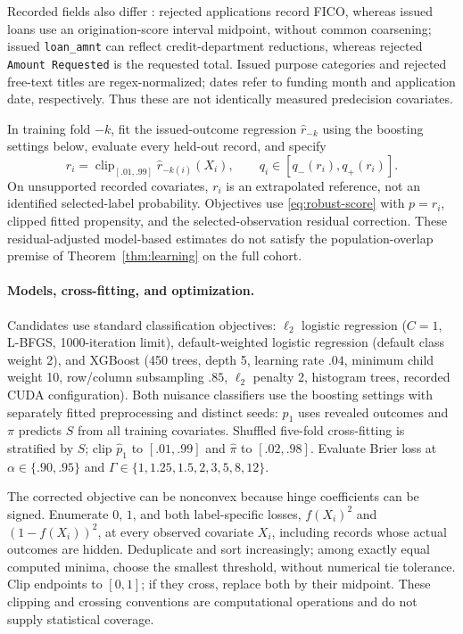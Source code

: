 Recorded fields also differ \citep{lendingclubdictionary}: rejected applications
record FICO, whereas issued loans use an origination-score interval midpoint,
without common coarsening; issued \texttt{loan\_amnt} can reflect credit-department
reductions, whereas rejected \texttt{Amount Requested} is the requested total.
Issued purpose categories and rejected free-text titles are regex-normalized;
dates refer to funding month and application date, respectively. Thus these are
not identically measured predecision covariates.

In training fold $-k$, fit the issued-outcome regression $\widehat r_{-k}$ using
the boosting settings below, evaluate every held-out record, and specify
\begin{equation}\label{eq:d:historical-extension}
r_i=\operatorname{clip}_{[.01,.99]}\widehat r_{-k(i)}(X_i),
\qquad q_i\in[q_-(r_i),q_+(r_i)].
\end{equation}
On unsupported recorded covariates, $r_i$ is an extrapolated reference, not an
identified selected-label probability. Objectives use \eqref{eq:robust-score}
with $p=r_i$, clipped fitted propensity, and the selected-observation residual
correction. These residual-adjusted model-based estimates do not satisfy the
population-overlap premise of Theorem~\ref{thm:learning} on the full cohort.

\paragraph{Models, cross-fitting, and optimization.}
Candidates use standard classification objectives: $\ell_2$ logistic regression
($C=1$, L-BFGS, 1000-iteration limit), default-weighted logistic regression
(default class weight 2), and XGBoost \citep{chen2016xgboost} (450 trees,
depth 5, learning rate $.04$, minimum child weight 10, row/column subsampling
$.85$, $\ell_2$ penalty 2, histogram trees, recorded CUDA configuration).
Both nuisance classifiers use the boosting settings with separately fitted
preprocessing and distinct seeds: $p_1$ uses revealed outcomes and $\pi$
predicts $S$ from all training covariates. Shuffled five-fold cross-fitting is
stratified by $S$; clip $\widehat p_1$ to $[.01,.99]$ and $\widehat\pi$ to
$[.02,.98]$. Evaluate Brier loss at $\alpha\in\{.90,.95\}$ and
$\Gamma\in\{1,1.25,1.5,2,3,5,8,12\}$.

The corrected objective can be nonconvex because hinge coefficients can be signed. Enumerate
$0$, $1$, and both label-specific losses, $f(X_i)^2$ and $(1-f(X_i))^2$, at every observed
covariate $X_i$, including records whose actual outcomes are hidden. Deduplicate and sort
increasingly; among exactly equal computed minima, choose the smallest threshold, without
numerical tie tolerance. Clip endpoints to $[0,1]$; if they cross, replace both by their
midpoint. These clipping and crossing conventions are computational operations and do not
supply statistical coverage.

